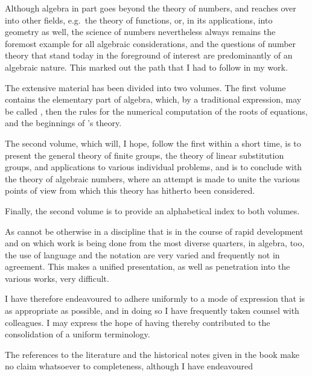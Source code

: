 \noindent Although algebra in part goes beyond the theory of numbers, and reaches over into other fields, e.g.\ the theory of functions, or, in its applications, into geometry as well, the science of numbers nevertheless always remains the foremost example for all algebraic considerations, and the questions of number theory that stand today in the foreground of interest are predominantly of an algebraic nature. This marked out the path that I had to follow in my work.

The extensive material has been divided into two volumes. The first volume contains the elementary part of algebra, which, by a traditional expression, may be called , then the rules for the numerical computation of the roots of equations, and the beginnings of 's theory.

The second volume, which will, I hope, follow the first within a short time, is to present the general theory of finite groups, the theory of linear substitution groups, and applications to various individual problems, and is to conclude with the theory of algebraic numbers, where an attempt is made to unite the various points of view from which this theory has hitherto been considered.

Finally, the second volume is to provide an alphabetical index to both volumes.

As cannot be otherwise in a discipline that is in the course of rapid development and on which work is being done from the most diverse quarters, in algebra, too, the use of language and the notation are very varied and frequently not in agreement. This makes a unified presentation, as well as penetration into the various works, very difficult.

I have therefore endeavoured to adhere uniformly to a mode of expression that is as appropriate as possible, and in doing so I have frequently taken counsel with colleagues. I may express the hope of having thereby contributed to the consolidation of a uniform terminology.

The references to the literature and the historical notes given in the book make no claim whatsoever to completeness, although I have endeavoured

